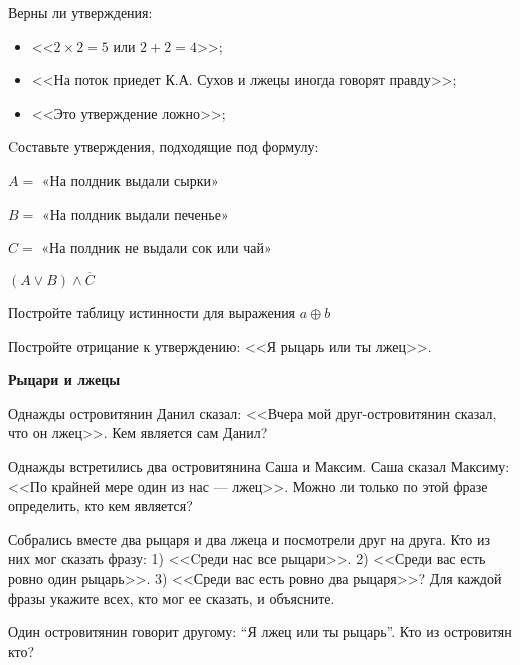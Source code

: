 \documentclass{article}
\begin{document}
    \begin{enumerate_boxed}

        \item Верны ли утверждения:
        \begin{itemize}
            \item <<$2 \times 2 = 5$ или $2 + 2 = 4$>>;

            \item <<На поток приедет К.А. Сухов и лжецы иногда говорят правду>>;

            \item <<Это утверждение ложно>>;
        \end{itemize}

        \item Cоставьте утверждения, подходящие под формулу:

        $A =$ «На полдник выдали сырки»

        $B =$ «На полдник выдали печенье»

        $C =$ «На полдник не выдали сок или чай»

        $(A\vee B)\wedge \overline{C}$


        \item Постройте таблицу истинности для выражения $a \oplus b$

        \item Постройте отрицание к утверждению: <<Я рыцарь или ты лжец>>.

    \end{enumerate_boxed}


    \begin{center}
        \textbf{Рыцари и лжецы}
    \end{center}

    \begin{enumerate_boxed}

        \item Однажды островитянин Данил сказал: <<Вчера мой друг-островитянин сказал, что он лжец>>.
        Кем является сам Данил?

        \item Однажды встретились два островитянина Саша и Максим.
        Саша сказал Максиму: <<По крайней мере один из нас — лжец>>.
        Можно ли только по этой фразе определить, кто кем является?

        \item Собрались вместе два рыцаря и два лжеца и посмотрели друг на друга.
        Кто из них мог сказать фразу: 1) <<Cреди нас все рыцари>>.
        2) <<Среди вас есть ровно один рыцарь>>.
        3) <<Среди вас есть ровно два рыцаря>>?
        Для каждой фразы укажите всех, кто мог ее сказать, и объясните.

        \item Один островитянин говорит другому: “Я лжец или ты рыцарь”.
        Кто из островитян кто?

    \end{enumerate_boxed}
\end{document}
